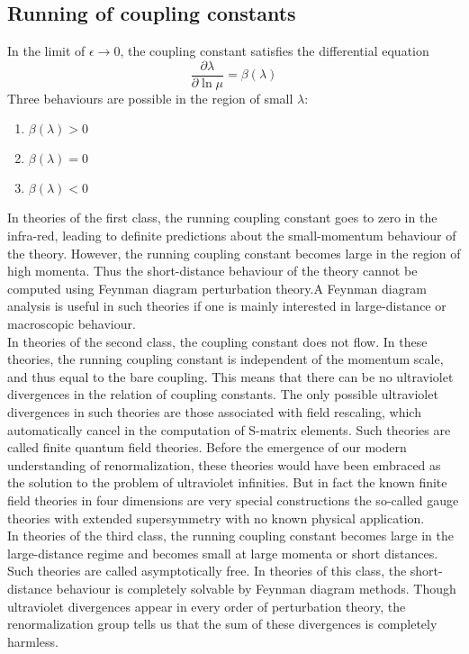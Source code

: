 \subsection{Running of coupling constants}
In the limit of $\epsilon \to 0$, the coupling constant satisfies the differential equation
\[\frac{\partial \lambda}{\partial \ln \mu} = \beta(\lambda)\]
Three behaviours are possible in the region of small $\lambda$:
\begin{enumerate}
\item $\beta(\lambda) > 0$
\item $\beta(\lambda) = 0$
\item $\beta(\lambda) < 0$
\end{enumerate}
\noindent
In theories of the first class, the running coupling constant goes to zero in the infra-red, leading to definite predictions about the small-momentum behaviour of the theory. However, the running coupling constant becomes large in the region of high momenta. Thus the short-distance behaviour of the theory cannot be computed using Feynman diagram perturbation theory.A Feynman diagram analysis is useful in such theories if one is mainly interested in large-distance or macroscopic behaviour.
\\
In theories of the second class, the coupling constant does not flow. In these theories, the running coupling constant is independent of the momentum scale, and thus equal to the bare coupling. This means that there can be no ultraviolet divergences in the relation of coupling constants. The only possible ultraviolet divergences in such theories are those associated with field rescaling, which automatically cancel in the computation of S-matrix elements. Such theories are called finite quantum field theories. Before the emergence of our modern understanding of renormalization, these theories would have been embraced as the solution to the problem of ultraviolet infinities. But in fact the known finite field theories in four dimensions are very special constructions the so-called gauge theories with extended supersymmetry with no known physical application. 
\\
In theories of the third class, the running coupling constant becomes large in the large-distance regime and becomes small at large momenta or short distances. Such theories are called asymptotically free. In theories of this class, the short-distance behaviour is completely solvable by Feynman diagram methods. Though ultraviolet divergences appear in every order of perturbation theory, the renormalization group tells us that the sum of these divergences is completely harmless.
